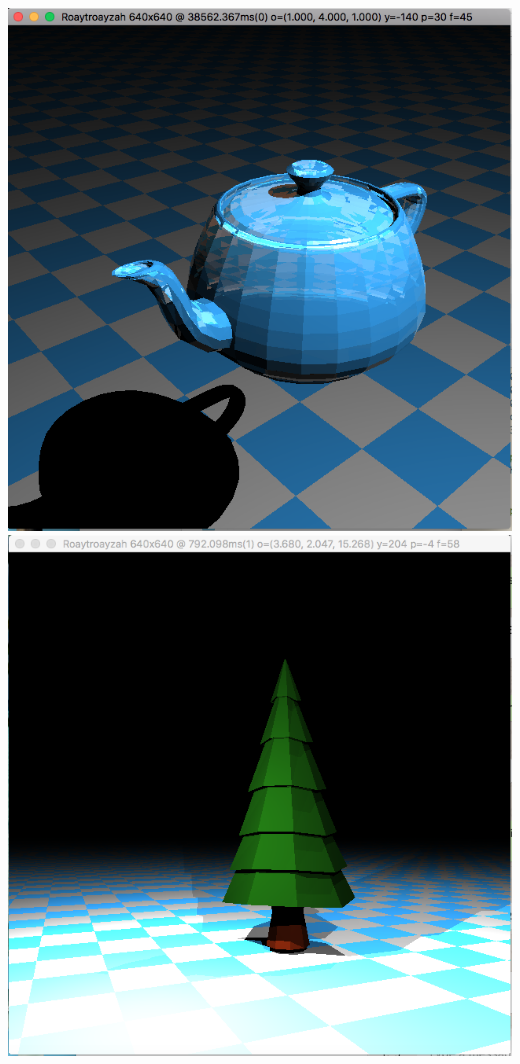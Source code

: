 \includegraphics[width=\textwidth]{img/refractingTeapot}
\includegraphics[width=\textwidth]{img/simpleTree}

